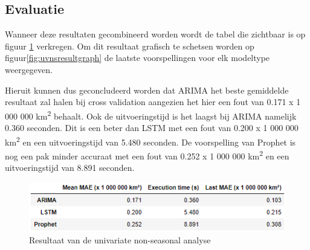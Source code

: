 \clearpage
\subsection{Evaluatie}

Wanneer deze resultaten gecombineerd worden wordt de tabel die zichtbaar is op figuur \ref{fig:uvnsresult} verkregen. Om dit resultaat grafisch te schetsen worden op figuur\ref{fig:uvnsresultgraph} de laatste voorspellingen voor elk modeltype weergegeven.

Hieruit kunnen dus geconcludeerd worden dat ARIMA het beste gemiddelde resultaat zal halen bij cross validation aangezien het hier een fout van 0.171 x 1 000 000 km\textsuperscript{2} behaalt. Ook de uitvoeringstijd is het laagst bij ARIMA namelijk 0.360 seconden. Dit is een beter dan LSTM met een fout van 0.200 x 1 000 000 km\textsuperscript{2} en een uitvoeringstijd van 5.480 seconden. De voorspelling van Prophet is nog een pak minder accuraat met een fout van 0.252 x 1 000 000 km\textsuperscript{2} en een uitvoeringstijd van 8.891 seconden.


\begin{figure}
    \centering
    \caption{Resultaat van de univariate non-seasonal analyse}
    \label{fig:uvnsresult}
    \includegraphics[width=0.7\linewidth]{uv_ns_result}
\end{figure}

